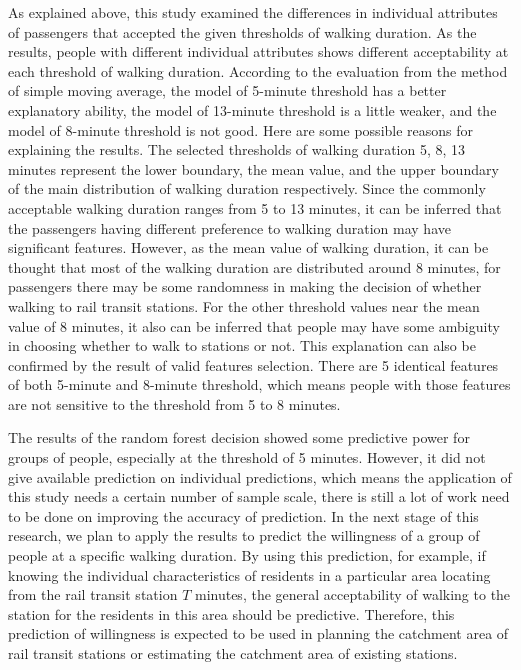 %
As explained above, this study examined the differences in individual attributes of passengers that accepted the given thresholds of walking duration. As the results, people with different individual attributes shows different acceptability at each threshold of walking duration. According to the evaluation from the method of simple moving average, the model of 5-minute threshold has a better explanatory ability, the model of 13-minute threshold is a little weaker, and the model of 8-minute threshold is not good. Here are some possible reasons for explaining the results. The selected thresholds of walking duration 5, 8, 13 minutes represent the lower boundary, the mean value, and the upper boundary of the main distribution of walking duration respectively. Since the commonly acceptable walking duration ranges from 5 to 13 minutes, it can be inferred that the passengers having different preference to walking duration may have significant features. However, as the mean value of walking duration, it can be thought that most of the walking duration are distributed around 8 minutes, for passengers there may be some randomness in making the decision of whether walking to rail transit stations. For the other threshold values near the mean value of 8 minutes, it also can be inferred that people may have some ambiguity in choosing whether to walk to stations or not. This explanation can also be confirmed by the result of valid features selection. There are 5 identical features of both 5-minute and 8-minute threshold, which means people with those features are not sensitive to the threshold from 5 to 8 minutes.

%
The results of the random forest decision showed some predictive power for groups of people, especially at the threshold of 5 minutes. However, it did not give available prediction on individual predictions, which means the application of this study needs a certain number of sample scale, there is still a lot of work need to be done on improving the accuracy of prediction. In the next stage of this research, we plan to apply the results to predict the willingness of a group of people at a specific walking duration. By using this prediction, for example, if knowing the individual characteristics of residents in a particular area locating from the rail transit station $T$ minutes, the general acceptability of walking to the station for the residents in this area should be predictive. Therefore, this prediction of willingness is expected to be used in planning the catchment area of rail transit stations or estimating the catchment area of existing stations.

\clearpage %

% 
